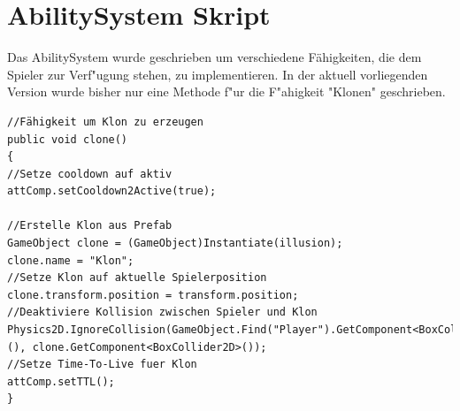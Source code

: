 \section{AbilitySystem Skript}
Das AbilitySystem wurde geschrieben um verschiedene Fähigkeiten, die dem Spieler zur Verf"ugung stehen, zu implementieren. In der aktuell vorliegenden Version wurde bisher nur eine Methode f"ur die F"ahigkeit "Klonen" geschrieben.
\begin{lstlisting}[breaklines=true]
//Fähigkeit um Klon zu erzeugen
public void clone()
{
//Setze cooldown auf aktiv
attComp.setCooldown2Active(true);

//Erstelle Klon aus Prefab
GameObject clone = (GameObject)Instantiate(illusion);
clone.name = "Klon";
//Setze Klon auf aktuelle Spielerposition
clone.transform.position = transform.position;
//Deaktiviere Kollision zwischen Spieler und Klon
Physics2D.IgnoreCollision(GameObject.Find("Player").GetComponent<BoxCollider2D>(), clone.GetComponent<BoxCollider2D>());
//Setze Time-To-Live fuer Klon
attComp.setTTL();
}
\end{lstlisting}